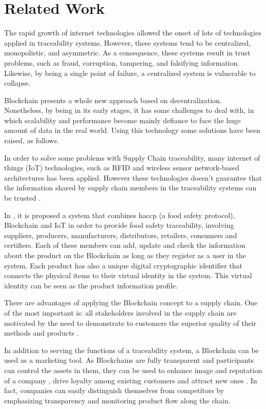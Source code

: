 \section{Related Work} \label{sec:RelatedWork}

The rapid growth of internet technologies allowed the onset of lots of technologies applied in traceability systems. However, these systems tend to be centralized, monopolistic, and asymmetric. As a consequence, these systems result in trust problems, such as fraud, corruption, tampering, and falsifying information. Likewise, by being a single point of failure, a centralized system is vulnerable to collapse.

Blockchain presents a whole new approach based on decentralization. Nonetheless, by being in its early stages, it has some challenges to deal with, in which scalability and performance become mainly defiance to face the huge amount of data in the real world. Using this technology some solutions have been raised, as follows.

In order to solve some problems with Supply Chain traceability, many internet of things (IoT) technologies, such as RFID and wireless sensor network-based architectures has been applied. However these technologies doesn't guarantee that the information shared by supply chain members in the traceability systems can be trusted \cite{tian2017supply}.

In \cite{tian2017supply}, it is proposed a system that combines haccp (a food safety protocol), Blockchain and IoT in order to provide food safety traceability, involving suppliers, producers, manufacturers, distributors, retailers, consumers and certifiers. Each of these members can add, update and check the information about the product on the Blockchain as long as they register as a user in the system. Each product has also a unique digital cryptographic identifier that connects the physical items to their virtual identity in the system. This virtual identity can be seen as the product information profile.

There are advantages of applying the Blockchain concept to a supply chain. One of the most important is: all stakeholders involved in the supply chain are motivated by the need to demonstrate to customers the superior quality of their methods and products \cite{lu2017adaptable}. 

In addition to serving the functions of a traceability system, a Blockchain can be used as a marketing tool. As Blockchains are fully transparent and participants can control the assets in them, they can be used to enhance image and reputation of a company \cite{van2007essentials}, drive loyalty among existing customers \cite{pizzuti2015global} and attract new ones \cite{svensson2009transparency}. In fact, companies can easily distinguish themselves from competitors by emphasizing transparency and monitoring product flow along the chain. 

